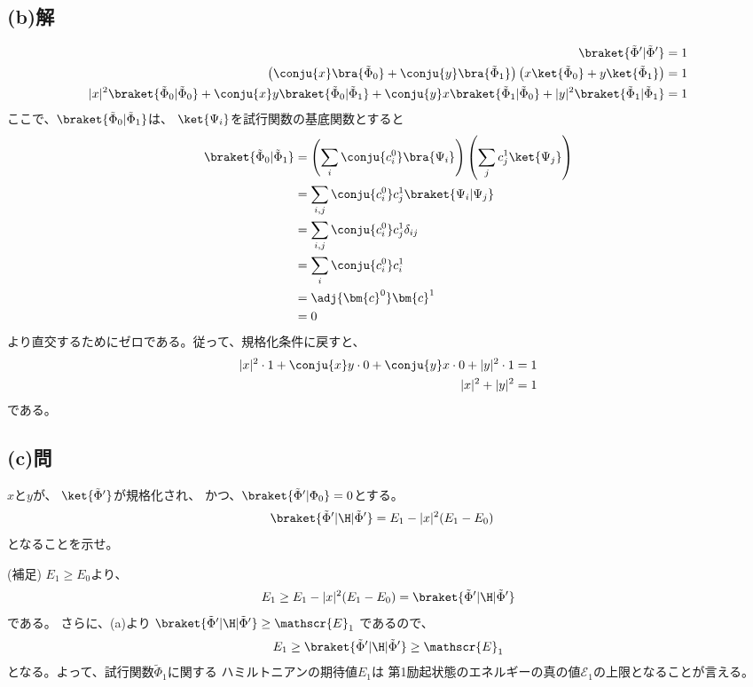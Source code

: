 \subsection{(b)解}
\begin{align}
	\braket{\tilde{\Phi}'|\tilde{\Phi}'}
&=
	1 \\
%
%
	\left(
		\conju{x}\bra{\tilde{\Phi}_0}
		+
		\conju{y}\bra{\tilde{\Phi}_1}
	\right)
		\left(
			x\ket{\tilde{\Phi}_0}
			+
			y\ket{\tilde{\Phi}_1}
		\right)
&=
	1 \\
%
%
	|x|^2 \braket{\tilde{\Phi}_0|\tilde{\Phi}_0}
	+
	\conju{x}y \braket{\tilde{\Phi}_0|\tilde{\Phi}_1}
	+
	\conju{y}x \braket{\tilde{\Phi}_1|\tilde{\Phi}_0}
	+
	|y|^2 \braket{\tilde{\Phi}_1|\tilde{\Phi}_1}
&=
	1
\end{align}
ここで、$\braket{\tilde{\Phi}_0|\tilde{\Phi}_1}$は、
$\ket{\Psi_i}$を試行関数の基底関数とすると
\begin{align}
	\braket{\tilde{\Phi}_0|\tilde{\Phi}_1}
&=
	\left(
		\sum_i \conju{c_i^0} \bra{\Psi_i}
	\right)
		\left(
			\sum_j c_j^1 \ket{\Psi_j}
		\right) \\
%
%
&=
	\sum_{i,j}
		\conju{c_i^0} c_j^1 \braket{\Psi_i|\Psi_j} \\
%
%
&=
	\sum_{i,j}
		\conju{c_i^0} c_j^1 \delta_{ij} \\
%
%
&=
	\sum_{i}
		\conju{c_i^0} c_i^1 \\
%
%
&=
	\adj{\bm{c}^0}\bm{c}^1 \\
%
%
&=
	0
\end{align}
より直交するためにゼロである。従って、規格化条件に戻すと、
\begin{align}
	|x|^2 \cdot 1
	+
	\conju{x}y \cdot 0
	+
	\conju{y}x \cdot 0
	+
	|y|^2 \cdot 1
&=
	1 \\
%
%
	|x|^2
	+
	|y|^2
&=
	1
\end{align}
である。

\subsection{(c)問}
$x$と$y$が、
$\ket{\tilde{\Phi}'}$が規格化され、
かつ、$\braket{\tilde{\Phi}'|\Phi_0}=0$とする。
\begin{align}
	\braket{\tilde{\Phi}'|\H|\tilde{\Phi}'}
&=
	E_1
	-
	|x|^2 (E_1-E_0)
\end{align}
となることを示せ。

(補足)
$E_1\geq E_0$より、
\begin{align}
	E_1
\geq
	E_1-|x|^2(E_1-E_0)
=
	\braket{\tilde{\Phi}'|\H|\tilde{\Phi}'}
\end{align}
である。
さらに、(a)より
$\braket{\tilde{\Phi}'|\H|\tilde{\Phi}'}\geq\mathscr{E}_1$
であるので、
\begin{align}
	E_1
\geq
	\braket{\tilde{\Phi}'|\H|\tilde{\Phi}'}
\geq
	\mathscr{E}_1
\end{align}
となる。よって、試行関数$\tilde{\Phi}_1$に関する
ハミルトニアンの期待値$E_1$は
第1励起状態のエネルギーの真の値$\mathscr{E}_1$の上限となることが言える。


